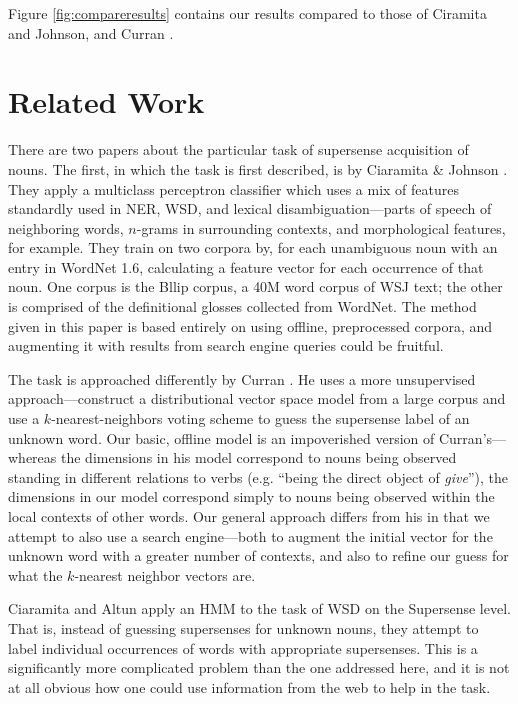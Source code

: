 \documentclass{article}
\begin{document}
Figure \ref{fig:compareresults} contains our results compared to those of Ciramita and Johnson, and Curran \cite{curran}.


\section{Related Work}


There are two papers about the particular task of supersense acquisition of nouns.
The first, in which the task is first described, is by Ciaramita \& Johnson \cite{cj}.
They apply a multiclass perceptron classifier which uses a mix of features standardly used in NER, WSD, and lexical disambiguation---parts of speech of neighboring words, $n$-grams in surrounding contexts, and morphological features, for example.
They train on two corpora by, for each unambiguous noun with an entry in WordNet 1.6, calculating a feature vector for each occurrence of that noun.
One corpus is the Bllip corpus, a 40M word corpus of WSJ text; the other is comprised of the definitional glosses collected from WordNet.
The method given in this paper is based entirely on using offline, preprocessed corpora, and augmenting it with results from search engine queries could be fruitful.

The task is approached differently by Curran \cite{curran}.
He uses a more unsupervised approach---construct a distributional vector space model from a large corpus and use a $k$-nearest-neighbors voting scheme to guess the supersense label of an unknown word.
Our basic, offline model is an impoverished version of Curran's---whereas the dimensions in his model correspond to nouns being observed standing in different relations to verbs (e.g. ``being the direct object of {\it give}''), the dimensions in our model correspond simply to nouns being observed within the local contexts of other words.
Our general approach differs from his in that we attempt to also use a search engine---both to augment the initial vector for the unknown word with a greater number of contexts, and also to refine our guess for what the $k$-nearest neighbor vectors are.

Ciaramita and Altun \cite{ciaramita-altun} apply an HMM to the task of WSD on the Supersense level.
That is, instead of guessing supersenses for unknown nouns, they attempt to label individual occurrences of words with appropriate supersenses.
This is a significantly more complicated problem than the one addressed here, and it is not at all obvious how one could use information from the web to help in the task.
\end{document}
